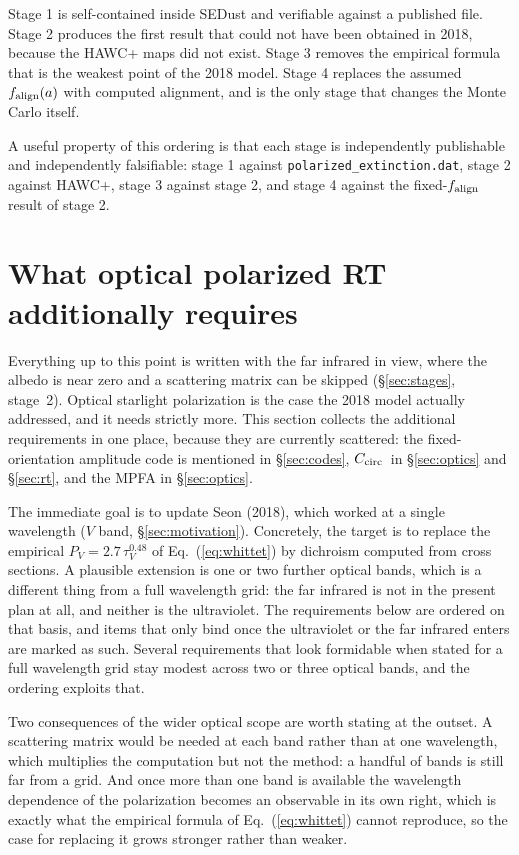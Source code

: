 \documentclass{my_memo}
\newcommand{\code}[1]{\texttt{#1}}
\newcommand{\Ccirc}{\ensuremath{C_{\rm circ}}}
\newcommand{\falign}{\ensuremath{f_{\rm align}}}
\begin{document}
Stage 1 is self-contained inside SEDust and verifiable against a
published file. Stage 2 produces the first result that could not have
been obtained in 2018, because the HAWC+ maps did not exist. Stage 3
removes the empirical formula that is the weakest point of the 2018
model. Stage 4 replaces the assumed $\falign(a)$ with computed
alignment, and is the only stage that changes the Monte Carlo itself.

A useful property of this ordering is that each stage is independently
publishable and independently falsifiable: stage 1 against
\code{polarized\_extinction.dat}, stage 2 against HAWC+, stage 3 against
stage 2, and stage 4 against the fixed-$\falign$ result of stage 2.

\section{What optical polarized RT additionally requires}
\label{sec:optical}

Everything up to this point is written with the far infrared in view,
where the albedo is near zero and a scattering matrix can be skipped
(\S\ref{sec:stages}, stage~2). Optical starlight polarization is the
case the 2018 model actually addressed, and it needs strictly more.
This section collects the additional requirements in one place, because
they are currently scattered: the fixed-orientation amplitude code is
mentioned in \S\ref{sec:codes}, \Ccirc\ in \S\ref{sec:optics} and
\S\ref{sec:rt}, and the MPFA in \S\ref{sec:optics}.

The immediate goal is to update Seon (2018), which worked at a single
wavelength ($V$ band, \S\ref{sec:motivation}). Concretely, the target is
to replace the empirical $P_V = 2.7\,\tau_V^{0.48}$ of
Eq.~(\ref{eq:whittet}) by dichroism computed from cross sections. A
plausible extension is one or two further optical bands, which is a
different thing from a full wavelength grid: the far infrared is not in
the present plan at all, and neither is the ultraviolet. The
requirements below are ordered on that basis, and items that only bind
once the ultraviolet or the far infrared enters are marked as such.
Several requirements that look formidable when stated for a full
wavelength grid stay modest across two or three optical bands, and the
ordering exploits that.

Two consequences of the wider optical scope are worth stating at the
outset. A scattering matrix would be needed at each band rather than at
one wavelength, which multiplies the computation but not the method: a
handful of bands is still far from a grid. And once more than one band
is available the wavelength dependence of the polarization becomes an
observable in its own right, which is exactly what the empirical formula
of Eq.~(\ref{eq:whittet}) cannot reproduce, so the case for replacing it
grows stronger rather than weaker.
\end{document}
